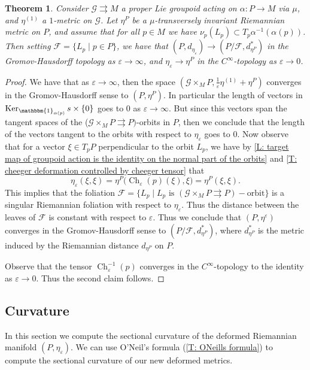 \documentclass[12pt,a4paper,reqno]{amsart}
\DeclareMathOperator{\Ch}{Ch}
\DeclareMathOperator{\kernel}{Ker}
\newcommand{\1}{\mathbbm{1}} %
\newcommand{\fol}{\mathcal{F}} %
\newcommand{\G}{\mathcal{G}} %
\newtheorem{thm}{Theorem}[section]
\theoremstyle{definition}
\theoremstyle{TheoremNum}
\begin{document}
\begin{thm}\th\label{T: Cheeger deformation collapses}
Consider $\G\rightrightarrows M$ a proper Lie groupoid acting on $\alpha\colon P\to M$ via $\mu$, and $\eta^{(1)}$ a $1$-metric on $\G$. Let $\eta^P$ be a $\mu$-transversely invariant Riemannian metric on $P$, and assume that for all $p\in M$ we have $\nu_p (L_p)\subset T_p \alpha^{-1}(\alpha(p))$. Then setting $\fol =\{L_p\mid p\in P\}$, we have that $(P,d_{\eta_{\varepsilon}})\to (P/\fol, d_{\eta^P}^\ast)$ in the Gromov-Hausdorff topology as $\varepsilon\to \infty$, and $\eta_{\varepsilon}\to \eta^P$ in the $C^{\infty}$-topology as $\varepsilon\to 0$. 
\end{thm}

\begin{proof}
We have that as $\varepsilon\to \infty$, then the space $(\G\times_M P,\frac{1}{\varepsilon}\eta^{(1)}+\eta^P)$ converges in the Gromov-Hausdorff sense to $(P,\eta^P)$. In particular the length of  vectors in $\kernel_{\1_{\alpha(p)}} s\times \{0\}$ goes to  $0$ as $\varepsilon \to \infty$. But since this vectors span the tangent spaces of the ($\G\times_M P\rightrightarrows P)$-orbits in $P$, then we conclude that the length of the vectors tangent to the orbits with respect to $\eta_\varepsilon$ goes to $0$. Now observe that for a vector $\xi\in T_pP$ perpendicular to the orbit $L_p$, we have by \th\ref{L: target map of groupoid action is the identity on the normal part of the orbits} and \th\ref{T: cheeger deformation controlled by cheeger tensor} that
\[
\eta_\varepsilon(\xi,\xi) = \eta^{P}\Big(\Ch_\varepsilon(p)(\xi),\xi\Big) = \eta^{P}(\xi,\xi).
\]
This implies that the foliation $\fol = \{L_p\mid L_p \mbox{ is } (\G\times_M P\rightrightarrows P)-\mbox{orbit}\}$ is a singular Riemannian foliation with respect to $\eta_\varepsilon$. Thus the distance between the leaves of $\fol$ is constant with respect to $\varepsilon$. Thus we conclude that $(P,\eta^\varepsilon)$ converges in the Gromov-Hausdorff sense to $(P/\fol,d_{\eta^{P}}^\ast)$, where $d_{\eta^{P}}^\ast$ is the metric induced by the Riemannian distance $d_{\eta^{P}}$ on $P$.

Observe that the tensor $\Ch^{-1}_\varepsilon(p)$ converges in the $C^\infty$-topology to the identity as $\varepsilon\to 0$. Thus the second claim follows.
\end{proof}

\subsection{Curvature} In this section we compute the sectional curvature of the deformed Riemannian manifold $(P,\eta_\varepsilon)$. We can use  O'Neil's formula (\th\ref{T: ONeills formula}) to compute the sectional curvature of our new deformed metrics. 
\end{document}
